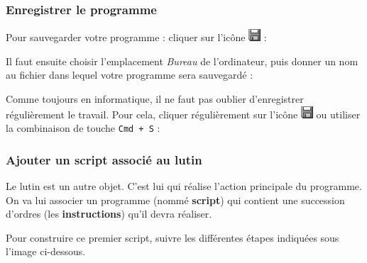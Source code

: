 





\subsubsection{Enregistrer le programme}

Pour sauvegarder votre programme : cliquer sur l'icône \includegraphics[width=.4cm]{./images/scratch/Sauver} :


Il faut ensuite choisir l'emplacement \emph{Bureau} de l'ordinateur, puis donner un nom au fichier dans lequel votre programme sera sauvegardé :



Comme toujours en informatique, il ne faut pas oublier d'enregistrer régulièrement le travail. Pour cela, cliquer régulièrement sur l'icône \includegraphics[width=.4cm]{./images/scratch/Sauver} ou utiliser la combinaison de touche \texttt{Cmd + S} :










\subsubsection{Ajouter un script associé au lutin}\label{ScriptLutin}

Le lutin est un autre objet. C'est lui qui réalise l'action principale du programme. On va lui associer un programme (nommé \textbf{script}) qui contient une succession d'ordres (les \textbf{instructions}) qu'il devra réaliser.  

Pour construire ce premier script, suivre les différentes étapes indiquées sous l'image ci-dessous.

